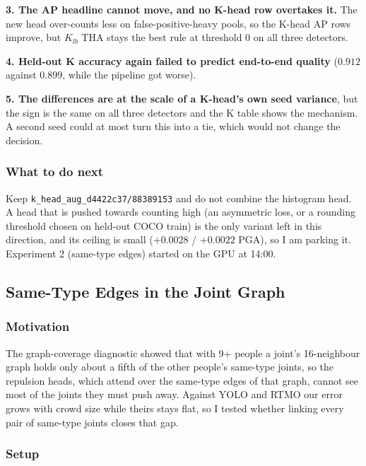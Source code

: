 \textbf{3. The AP headline cannot move, and no K-head row overtakes it.} The new head over-counts less on false-positive-heavy pools, so the K-head AP rows improve, but $K_{lb}$ THA stays the best rule at threshold 0 on all three detectors.

\textbf{4. Held-out K accuracy again failed to predict end-to-end quality} ($0.912$ against $0.899$, while the pipeline got worse).

\textbf{5. The differences are at the scale of a K-head's own seed variance}, but the sign is the same on all three detectors and the K table shows the mechanism. A second seed could at most turn this into a tie, which would not change the decision.

\subsubsection{What to do next}

Keep \texttt{k\_head\_aug\_d4422c37/88389153} and do not combine the histogram head. A head that is pushed towards counting high (an asymmetric loss, or a rounding threshold chosen on held-out COCO train) is the only variant left in this direction, and its ceiling is small ($+0.0028$ / $+0.0022$ PGA), so I am parking it. Experiment 2 (same-type edges) started on the GPU at 14:00.

\subsection{Same-Type Edges in the Joint Graph}

\subsubsection{Motivation}

The graph-coverage diagnostic showed that with 9+ people a joint's 16-neighbour graph holds only about a fifth of the other people's same-type joints, so the repulsion heads, which attend over the same-type edges of that graph, cannot see most of the joints they must push away.
Against YOLO and RTMO our error grows with crowd size while theirs stays flat, so I tested whether linking every pair of same-type joints closes that gap.

\subsubsection{Setup}

